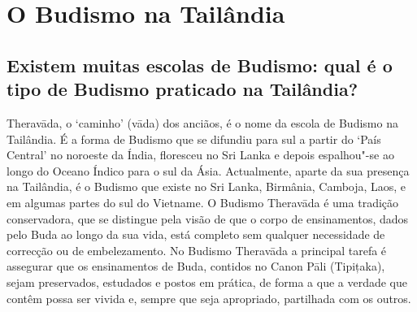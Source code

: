 

\setlength{\chapterTitleTopSkip}{60mm}


\enlargethispage{2\baselineskip}

\chapter{O Budismo na Tailândia}

\section{Existem muitas escolas de Budismo: qual é o tipo de Budismo praticado
  na Tailândia?}

Theravāda, o `caminho' (vāda) dos anciãos, é o nome da escola de
Budismo na Tailândia. É a forma de Budismo que se difundiu para sul a
partir do `País Central' no noroeste da Índia, floresceu no Sri Lanka
e depois espalhou"-se ao longo do Oceano Índico para o sul da Ásia.
Actualmente, aparte da sua presença na Tailândia, é o Budismo que existe
no Sri Lanka, Birmânia, Camboja, Laos, e em algumas partes do sul do Vietname.
O Budismo Theravāda é uma tradição conservadora, que se distingue
pela visão de que o corpo de ensinamentos, dados pelo Buda ao longo da
sua vida, está completo sem qualquer necessidade de correcção ou de
embelezamento. No Budismo Theravāda a principal tarefa é assegurar que
os ensinamentos de Buda, contidos no Canon Pāli (Tipițaka), sejam
preservados, estudados e postos em prática, de forma a que a verdade que
contêm possa ser vivida e, sempre que seja apropriado, partilhada com os
outros.

